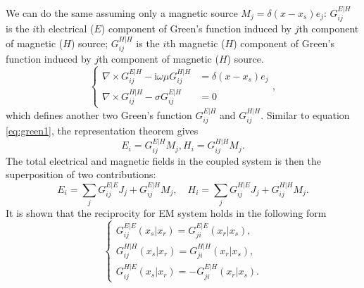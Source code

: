 \documentclass[a4paper,10pt]{article}
\begin{document}
We can do the same assuming only a magnetic source $M_j=\delta(x-x_s)e_j$: 
$G_{ij}^{E|H}$ is the $i$th electrical ($E$)  component of Green's function 
induced by $j$th component of magnetic ($H$) source; $G_{ij}^{H|H}$ is the 
$i$th magnetic ($H$) component of Green's function induced by $j$th component of 
magnetic ($H$) source.
\begin{equation}\label{eq:HH|E|H}
  \begin{cases}
    \nabla \times G_{ij}^{E|H} -\mathrm{i}\omega\mu  G_{ij}^{H|H} &= \delta(x-x_s)e_j \\
    \nabla \times G_{ij}^{H|H} -\sigma  G_{ij}^{E|H}  &=0
  \end{cases},
\end{equation}
which defines another two Green's function $G_{ij}^{E|H}$ and $G_{ij}^{H|H}$. Similar to equation \eqref{eq:green1}, the representation theorem gives
\begin{equation}
  E_i =  G_{ij}^{E|H} M_j, H_i = G_{ij}^{H|H} M_j.
\end{equation}
The total electrical  and magnetic fields in the coupled system is then the 
superposition of two contributions:
\begin{equation}
  E_i =\sum_j G_{ij}^{E|E} J_j + G_{ij}^{E|H} M_j, \quad 
  H_i =\sum_j G_{ij}^{H|E} J_j + G_{ij}^{H|H} M_j.
\end{equation}
It is shown that the reciprocity for EM system holds in the following form
\begin{equation}\label{eq:reciprocity}
  \begin{cases}
  G_{ij}^{E|E}(x_s|x_r) =  G_{ji}^{E|E}(x_r|x_s),\\
  G_{ij}^{H|H}(x_s|x_r) =  G_{ji}^{H|H}(x_r|x_s),\\
  G_{ij}^{H|E}(x_s|x_r) = - G_{ji}^{E|H}(x_r|x_s).
  \end{cases}
\end{equation}
\end{document}
